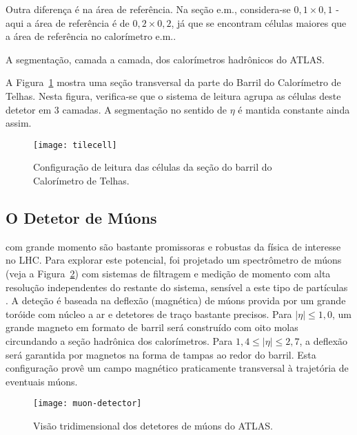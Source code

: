 Outra diferença é na área de referência. Na seção e.m., considera-se
$0,1\times0,1$ - aqui a área de referência é de $0,2\times0,2$, já que se
encontram células maiores que a área de referência no calorímetro e.m..

\begin{table}
\caption{A segmentação, camada a camada, dos calo\-rí\-metros ha\-drô\-nicos
do ATLAS.}
\label{tab:had}
\begin{center}

\end{center}
\end{table}

A Figura~\ref{fig:tilecell} mostra uma seção transversal da parte do Barril do
Calorímetro de Telhas. Nesta figura, verifica-se que o sistema de leitura
agrupa as células deste detetor em 3 camadas. A segmentação no sentido de
$\eta$ é mantida constante ainda assim.

\begin{figure}
\begin{center}
\texttt{[image: tilecell]}
\end{center}
\caption{Configuração de leitura das células da seção do barril do Calorímetro
de Telhas.}
\label{fig:tilecell}
\end{figure}

\subsection{O Detetor de Múons}
\label{sec:atlas-muon}

 com grande momento são  bastante
promissoras e robustas da física de interesse no LHC. Para explorar este
potencial, foi projetado um spectrômetro de múons (veja a
Figura~\ref{fig:atlas-muon-3d}) com sistemas de filtragem e medição de momento
com alta resolução independentes do restante do sistema, sensível a este tipo
de partículas \cite{atlas-mu-tdr}. A deteção é baseada na deflexão (magnética)
de múons provida por um grande toróide com núcleo a ar e detetores de traço
bastante precisos. Para $|\eta| \leq 1,0$, um grande magneto em formato de
barril será construído com oito molas circundando a seção hadrônica dos
calorímetros. Para $1,4 \leq |\eta| \leq 2,7$, a deflexão será garantida por
magnetos na forma de tampas ao redor do barril. Esta configuração provê um
campo magnético praticamente transversal à trajetória de eventuais múons.

\begin{figure}
\begin{center}
\texttt{[image: muon-detector]}
\end{center}
\caption{Visão tridimensional dos detetores de múons do ATLAS.}
\label{fig:atlas-muon-3d}
\end{figure}

